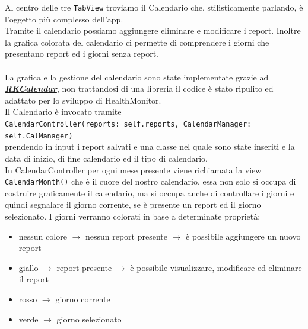 \documentclass{article}
\begin{document}
Al centro delle tre \texttt{TabView} troviamo il Calendario che, stilisticamente parlando, è l'oggetto più complesso dell'app.\\
Tramite il calendario possiamo aggiungere eliminare e modificare i report. Inoltre la grafica colorata del calendario ci permette di comprendere i giorni che presentano report ed i giorni senza report. \\
\\
La grafica e la gestione del calendario sono state implementate grazie ad \textbf{\textit{\href{https://github.com/RaffiKian/RKCalendar}{RKCalendar}}}, non trattandosi di una libreria il codice è stato ripulito ed adattato per lo sviluppo di HealthMonitor.\\
Il Calendario è invocato tramite \\
\texttt{CalendarController(reports: self.reports, CalendarManager: self.CalManager)} \\
prendendo in input i report salvati e una classe nel quale sono state inseriti e la data di inizio, di fine calendario ed il tipo di calendario.\\
In CalendarController per ogni mese presente viene richiamata la view \texttt{CalendarMonth()} che è il cuore del nostro calendario, essa non solo si occupa di costruire graficamente il calendario, ma si occupa anche di controllare i giorni e quindi segnalare il giorno corrente, se è presente un report ed il giorno selezionato. I giorni verranno colorati in base a determinate proprietà:
\begin{itemize}
  \item nessun colore $\rightarrow$ nessun report presente $\rightarrow$ è possibile aggiungere un nuovo report
  \item giallo $\rightarrow$ report presente $\rightarrow$ è possibile visualizzare, modificare ed eliminare il report
  \item rosso $\rightarrow$ giorno corrente 
  \item verde $\rightarrow$ giorno selezionato
\end{itemize}
\end{document}
